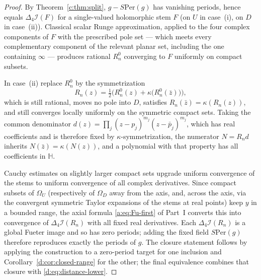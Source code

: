 \documentclass[11pt,a4paper]{article}
\numberwithin{equation}{section}
\theoremstyle{definition}
\theoremstyle{remark}
\theoremstyle{plain}
\newcommand{\HH}{\mathbb H}
\newcommand{\lap}{\Delta_4}
\newcommand{\I}{\mathcal I}
\newcommand{\Om}{\Omega}
\newcommand{\Per}{\mathrm{Per}}
\begin{document}
\begin{proof}
By Theorem~\ref{c:thm:split}, $g-S\Per(g)$ has vanishing periods,
hence equals $\lap\I(F)$ for a single-valued holomorphic stem $F$ (on $U$
in case~(i), on $D$ in case~(ii)).  Classical scalar Runge approximation,
applied to the four complex components of $F$ with the prescribed pole set
--- which meets every complementary component of the relevant planar set,
including the one containing $\infty$ --- produces rational $R_n^0$
converging to $F$ uniformly on compact subsets.

In case~(ii) replace $R_n^0$ by the symmetrization
\begin{equation}
 R_n(z)=\tfrac12\bigl(R_n^0(z)+\kappa\bigl(R_n^0(\bar z)\bigr)\bigr),
 \label{d:eq:symmetrization}
\end{equation}
which is still rational, moves no pole into $D$, satisfies
$R_n(\bar z)=\kappa(R_n(z))$, and still converges locally uniformly on the
symmetric compact sets.  Taking the common denominator
$d(z)=\prod_j(z-p_j)^{m_j}(z-\bar p_j)^{m_j}$, which has real coefficients
and is therefore fixed by $\kappa$-symmetrization, the numerator
$N=R_nd$ inherits $N(\bar z)=\kappa(N(z))$, and a polynomial with that
property has all coefficients in $\HH$.

Cauchy estimates on slightly larger compact sets upgrade uniform
convergence of the stems to uniform convergence of all complex
derivatives.  Since compact subsets of $\Om_U$ (respectively of $\Om_D$
away from the axis, and, across the axis, via the convergent symmetric
Taylor expansions of the stems at real points) keep $y$ in a bounded range,
the axial formula \eqref{a:eq:Fu-first} of Part~I converts this into
convergence of $\lap\I(R_n)$ with all fixed real derivatives.  Each
$\lap\I(R_n)$ is a global Fueter image and so has zero periods; adding the
fixed field $S\Per(g)$ therefore reproduces exactly the periods of $g$.
The closure statement follows by applying the construction to a zero-period
target for one inclusion and Corollary~\ref{d:cor:closed-range} for the
other; the final equivalence combines that closure with
\eqref{d:eq:distance-lower}.
\end{proof}
\end{document}
